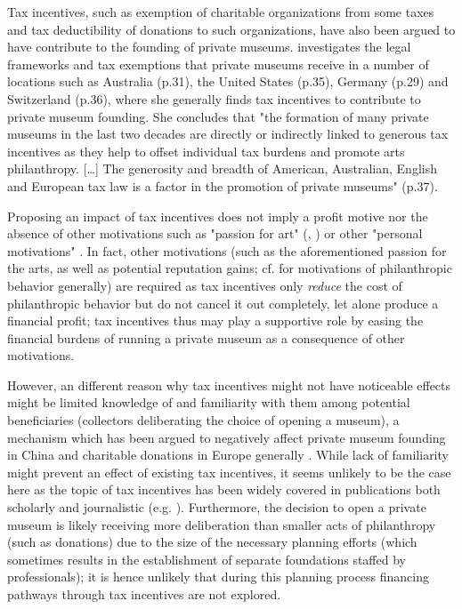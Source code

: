 \documentclass[11pt]{article}
\begin{document}
Tax incentives, such as exemption of charitable organizations from some taxes and tax deductibility of donations to such organizations, have also been argued to have contribute to the founding of private museums.
\textcite{Walker_2019_collector} investigates the legal frameworks and tax exemptions that private museums receive in a number of locations such as Australia (p.31), the United States (p.35), Germany (p.29) and Switzerland (p.36), where she generally finds tax incentives to contribute to private museum founding. 
She concludes that "the formation of many private museums in the last two decades are directly or indirectly linked to generous tax incentives as they help to offset individual tax burdens and promote arts philanthropy. [\ldots{}] The generosity and breadth of American, Australian, English and European tax law is a factor in the promotion of private museums" (p.37).








Proposing an impact of tax incentives does not imply a profit motive nor the absence of other motivations such as "passion for art" (\cite[p.7]{Zorloni_Resch_2016_opportunities}, \cite[p.12]{Adam_2021_rise}) or other "personal motivations" \parencite[p.144]{Walker_2019_collector}. 
In fact, other motivations (such as the aforementioned passion for the arts, as well as potential reputation gains; cf. \textcite{Bekkers_Wiepking_2010_literature,Bekkers_Wiepking_2011_philanthropic} for motivations of philanthropic behavior generally) are required as tax incentives only \emph{reduce} the cost of philanthropic behavior but do not cancel it out completely, let alone produce a financial profit; tax incentives thus may play a supportive role by easing the financial burdens of running a private museum as a consequence of other motivations.


However, an different reason why tax incentives might not have noticeable effects might be limited knowledge of and familiarity with them among potential beneficiaries (collectors deliberating the choice of opening a museum), a mechanism which has been argued to negatively affect private museum founding in China \parencite[p.222]{DeNigris_2018_museums} and charitable donations in Europe generally \parencite{Hemels_2017_incentives}.
While lack of familiarity might prevent an effect of existing tax incentives, it seems unlikely to be the case here as the topic of tax incentives has been widely covered in publications both scholarly \parencite{Walker_2019_collector,Reich_2018_philantropy,Zorloni_Resch_2016_opportunities} and journalistic (e.g. \cite{Brown_Pes_2018_taxpayers,Boucher_2020_solow,Honig_2016_IRS}).
Furthermore, the decision to open a private museum is likely receiving more deliberation than smaller acts of philanthropy (such as donations) due to the size of the necessary planning efforts (which sometimes results in the establishment of separate foundations staffed by professionals); it is hence unlikely that during this planning process financing pathways through tax incentives are not explored.
\end{document}
